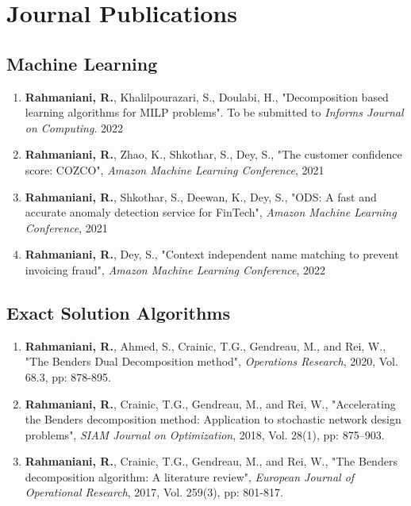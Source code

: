 \documentclass[10PT,letter]{article}
\newcommand{\subsectionstyle}[1]{\normalfont\selectfont\textcolor{titlecol}{\sffamily #1}}
\newcommand{\numbox}[1]{} %
\begin{document}
\section*{\numbox{3}\bfseries\textcolor{titlecol}{\sffamily Journal Publications }}  
		\subsection*{\subsectionstyle{Machine Learning}}
		\begin{enumerate}
			\item 	\textbf{Rahmaniani, R.}, Khalilpourazari, S., Doulabi, H., "Decomposition based learning algorithms for MILP problems".  To be submitted to \textit{Informs Journal on Computing}. 2022
			\item \textbf{Rahmaniani, R.}, Zhao, K., Shkothar, S.,  Dey, S., "The customer confidence score: COZCO", \textit{Amazon Machine Learning Conference}, 2021 
			\item \textbf{Rahmaniani, R.}, Shkothar, S., Deewan, K., Dey, S., "ODS: A fast and accurate anomaly detection service for FinTech", \textit{Amazon Machine Learning Conference}, 2021
			\item \textbf{Rahmaniani, R.},  Dey, S., "Context independent name matching to prevent invoicing fraud", \textit{Amazon Machine Learning Conference}, 2022
		\end{enumerate}
        \subsection*{\subsectionstyle{Exact  Solution Algorithms}}
	        \begin{enumerate}[itemsep=.5mm]
					\item 
								\textbf{Rahmaniani, R.}, Ahmed, S., Crainic, T.G., Gendreau, M., and Rei, W., "The Benders Dual Decomposition method", \textit{Operations Research}, 2020, Vol. 68.3, pp: 878-895.
					\item 
								\textbf{Rahmaniani, R.}, Crainic, T.G., Gendreau, M., and Rei, W., "Accelerating the Benders decomposition method: Application to stochastic network design problems", \textit{SIAM Journal on Optimization}, 2018, Vol. 28(1), pp: 875–903.
					\item
								 \textbf{Rahmaniani, R.}, Crainic, T.G., Gendreau, M., and Rei, W., "The Benders decomposition algorithm: A literature review", \textit{European Journal of Operational Research}, 2017, Vol. 259(3), pp: 801-817.
			\end{enumerate}
\end{document}
